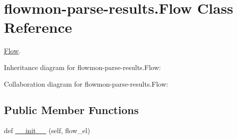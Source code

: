 \hypertarget{classflowmon-parse-results_1_1Flow}{}\section{flowmon-\/parse-\/results.Flow Class Reference}
\label{classflowmon-parse-results_1_1Flow}


\hyperlink{classflowmon-parse-results_1_1Flow}{Flow}.  




Inheritance diagram for flowmon-\/parse-\/results.Flow\+:


Collaboration diagram for flowmon-\/parse-\/results.Flow\+:
\subsection*{Public Member Functions}
\begin{DoxyCompactItemize}
\item 
def \hyperlink{classflowmon-parse-results_1_1Flow_a89e1cb163dc1b1d04b844829eede004f}{\+\_\+\+\_\+init\+\_\+\+\_\+} (self, flow\+\_\+el)
\end{DoxyCompactItemize}
